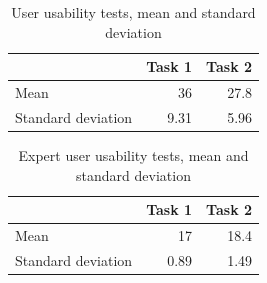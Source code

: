 \begin{table}[]
\centering
\begin{tabular}{l|r|r|}
\cline{2-3}
 & \multicolumn{1}{l|}{Task 1} & \multicolumn{1}{l|}{Task 2} \\ \hline
\multicolumn{1}{|l|}{Mean} & 36 & 27.8 \\ \hline
\multicolumn{1}{|l|}{Standard deviation} & 9.31 & 5.96 \\ \hline
\end{tabular}
\caption{User usability tests, mean and standard deviation}
\label{eval:automation2}
\end{table}


\begin{table}[]
\centering
\begin{tabular}{l|r|r|}
\cline{2-3}
 & \multicolumn{1}{l|}{Task 1} & \multicolumn{1}{l|}{Task 2} \\ \hline
\multicolumn{1}{|l|}{Mean} & 17 & 18.4 \\ \hline
\multicolumn{1}{|l|}{Standard deviation} & 0.89 & 1.49 \\ \hline
\end{tabular}
\caption{Expert user usability tests, mean and standard deviation}
\label{eval:automation3}
\end{table}



